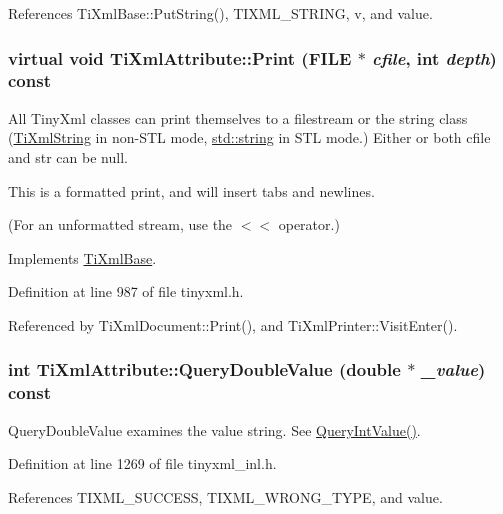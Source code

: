 References TiXmlBase::PutString(), TIXML\_\-STRING, v, and value.\hypertarget{class_ti_xml_attribute_acc04956c1d5c4c31fe74f7a7528d109a}{
\subsubsection[{Print}]{\setlength{\rightskip}{0pt plus 5cm}virtual void TiXmlAttribute::Print (FILE $\ast$ {\em cfile}, \/  int {\em depth}) const}}
\label{class_ti_xml_attribute_acc04956c1d5c4c31fe74f7a7528d109a}
All TinyXml classes can print themselves to a filestream or the string class (\hyperlink{class_ti_xml_string}{TiXmlString} in non-\/STL mode, \hyperlink{classstd_1_1string}{std::string} in STL mode.) Either or both cfile and str can be null.

This is a formatted print, and will insert tabs and newlines.

(For an unformatted stream, use the $<$$<$ operator.) 

Implements \hyperlink{class_ti_xml_base_a0de56b3f2ef14c65091a3b916437b512}{TiXmlBase}.

Definition at line 987 of file tinyxml.h.

Referenced by TiXmlDocument::Print(), and TiXmlPrinter::VisitEnter().\hypertarget{class_ti_xml_attribute_ac87b2a8489906a5d7aa2875f20be3513}{
\subsubsection[{QueryDoubleValue}]{\setlength{\rightskip}{0pt plus 5cm}int TiXmlAttribute::QueryDoubleValue (double $\ast$ {\em \_\-value}) const}}
\label{class_ti_xml_attribute_ac87b2a8489906a5d7aa2875f20be3513}


QueryDoubleValue examines the value string. See \hyperlink{class_ti_xml_attribute_ad6c93088ee21af41a107931223339344}{QueryIntValue()}. 

Definition at line 1269 of file tinyxml\_\-inl.h.

References TIXML\_\-SUCCESS, TIXML\_\-WRONG\_\-TYPE, and value.

